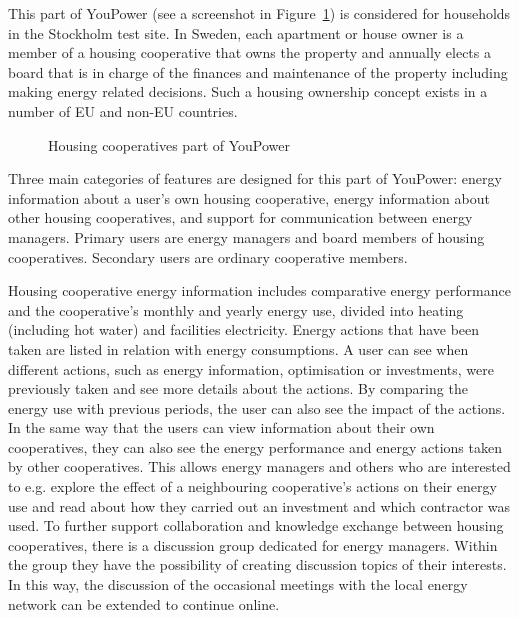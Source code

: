 This part of YouPower (see a screenshot in Figure~\ref{fig:brf}) is considered for households in the Stockholm test site. In Sweden, each apartment or house owner is a member of a housing cooperative that owns the property and annually elects a board that is in charge of the finances and maintenance of the property including making energy related decisions. 
Such a housing ownership concept exists in a number of EU and non-EU countries.

\begin{figure}[t!]
\centering
{}
\caption{Housing cooperatives part of YouPower}
\label{fig:brf}
\end{figure}


% 
Three main categories of features are designed for this part of YouPower: energy information about a user's own housing cooperative, energy information about other housing cooperatives, and support for communication between energy managers.
Primary users are energy managers and board members of housing cooperatives. Secondary users are ordinary cooperative members. 

Housing cooperative energy information includes comparative energy performance %
and the cooperative's monthly and yearly energy use, divided into heating (including hot water) and facilities electricity. Energy actions that have been taken are listed in relation with energy consumptions. 
A user can see when different actions, such as energy information, optimisation or investments, were previously taken and see more details about the actions. By comparing the energy use with previous periods, the user can also see the impact of the actions.
% 
In the same way that the users can view information about their own cooperatives, they can also see the energy performance and energy actions taken by other cooperatives. This allows energy managers and others who are interested to e.g. explore the effect of a neighbouring cooperative's actions on their energy use and read about how they carried out an investment and which contractor was used. 
% 
To further support collaboration and knowledge exchange between housing cooperatives, there is a discussion group dedicated for energy managers. Within the group they have the possibility of creating discussion topics of their interests. In this way, the discussion of the occasional meetings with the local energy network can be extended to continue online.

